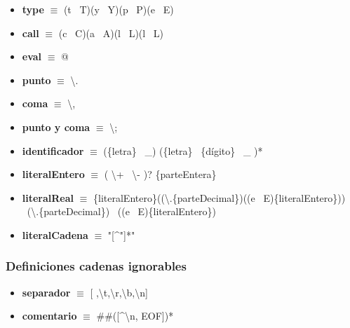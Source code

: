 \documentclass[11pt]{article}
\begin{document}
\begin{itemize}
            \item \textbf{type }$\equiv$ (t \textbar\ T)(y \textbar\ Y)(p \textbar\ P)(e \textbar\ E)
            \item \textbf{call }$\equiv$ (c \textbar\ C)(a \textbar\ A)(l \textbar\ L)(l \textbar\ L)
            \item \textbf{eval }$\equiv$ @
            \item \textbf{punto }$\equiv$ \textbackslash.
            \item \textbf{coma }$\equiv$ \textbackslash,
            \item \textbf{punto y coma }$\equiv$ \textbackslash;
            \item \textbf{identificador }$\equiv$ (\{letra\} \textbar\ \_) (\{letra\} \textbar\ \{dígito\} \textbar\ \_ )*
            \item \textbf{literalEntero }$\equiv$ ( \textbackslash + \textbar\ \textbackslash - )? \{parteEntera\}
            \item \textbf{literalReal }  $\equiv$ \{literalEntero\}((\textbackslash.\{parteDecimal\})((e \textbar\ E)\{literalEntero\})) \textbar\ (\textbackslash.\{parteDecimal\}) \textbar\ ((e \textbar\ E)\{literalEntero\})
            \item \textbf{literalCadena }  $\equiv$ "[\^{}"]*"
        \end{itemize}
        \subsubsection*{Definiciones cadenas ignorables}
        \begin{itemize}
            \item \textbf{separador }$\equiv$ [ ,\textbackslash t,\textbackslash r,\textbackslash b,\textbackslash n]
            \item \textbf{comentario }$\equiv$ \#\#([\^{}\textbackslash n, EOF])*
        \end{itemize}
\end{document}
